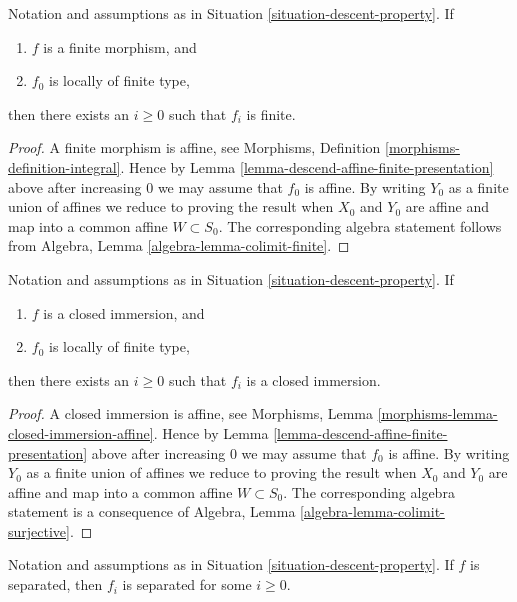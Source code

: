 \begin{lemma}
\label{lemma-descend-finite-finite-presentation}
Notation and assumptions as in Situation \ref{situation-descent-property}.
If
\begin{enumerate}
\item $f$ is a finite morphism, and
\item $f_0$ is locally of finite type,
\end{enumerate}
then there exists an $i \geq 0$ such that $f_i$ is finite.
\end{lemma}

\begin{proof}
A finite morphism is affine, see
Morphisms, Definition \ref{morphisms-definition-integral}.
Hence by Lemma \ref{lemma-descend-affine-finite-presentation} above
after increasing $0$ we may assume that $f_0$ is affine.
By writing $Y_0$ as a finite union of affines we reduce to proving
the result when $X_0$ and $Y_0$ are affine and map
into a common affine $W \subset S_0$. The corresponding algebra
statement follows from Algebra, Lemma \ref{algebra-lemma-colimit-finite}.
\end{proof}

\begin{lemma}
\label{lemma-descend-closed-immersion-finite-presentation}
Notation and assumptions as in Situation \ref{situation-descent-property}.
If
\begin{enumerate}
\item $f$ is a closed immersion, and
\item $f_0$ is locally of finite type,
\end{enumerate}
then there exists an $i \geq 0$ such that $f_i$ is a closed immersion.
\end{lemma}

\begin{proof}
A closed immersion is affine, see
Morphisms, Lemma \ref{morphisms-lemma-closed-immersion-affine}.
Hence by Lemma \ref{lemma-descend-affine-finite-presentation} above
after increasing $0$ we may assume that $f_0$ is affine.
By writing $Y_0$ as a finite union of affines we reduce to proving
the result when $X_0$ and $Y_0$ are affine and map
into a common affine $W \subset S_0$. The corresponding algebra
statement is a consequence of
Algebra, Lemma \ref{algebra-lemma-colimit-surjective}.
\end{proof}

\begin{lemma}
\label{lemma-descend-separated-finite-presentation}
Notation and assumptions as in Situation \ref{situation-descent-property}.
If $f$ is separated, then $f_i$ is separated for some $i \geq 0$.
\end{lemma}

